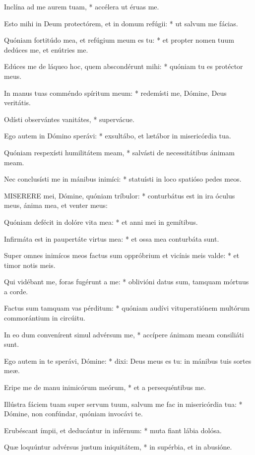 Inclína ad me aurem tuam, * accélera ut éruas me.

Esto mihi in Deum protectórem, et in domum refúgii: * ut salvum me fácias.

Quóniam fortitúdo mea, et refúgium meum es tu: * et propter nomen tuum dedúces me, et enútries me.

Edúces me de láqueo hoc, quem abscondérunt mihi: * quóniam tu es protéctor meus.

In manus tuas comméndo spíritum meum: * redemísti me, Dómine, Deus veritátis.

Odísti observántes vanitátes, * supervácue.

Ego autem in Dómino sperávi: * exsultábo, et lætábor in misericórdia tua.

Quóniam respexísti humilitátem meam, * salvásti de necessitátibus ánimam meam.

Nec conclusísti me in mánibus inimíci: * statuísti in loco spatióso pedes meos.


\lettrine[lines=2]{M}{ISERERE} mei, Dómine, quóniam tríbulor: * conturbátus est in ira óculus meus, ánima mea, et venter meus:

Quóniam defécit in dolóre vita mea: * et anni mei in gemítibus.

Infirmáta est in paupertáte virtus mea: * et ossa mea conturbáta sunt.

Super omnes inimícos meos factus sum oppróbrium et vicínis meis valde: * et timor notis meis.

Qui vidébant me, foras fugérunt a me: * oblivióni datus sum, tamquam mórtuus a corde.

Factus sum tamquam vas pérditum: * quóniam audívi vituperatiónem multórum commorántium in circúitu.

In eo dum convenírent simul advérsum me, * accípere ánimam meam consiliáti sunt.

Ego autem in te sperávi, Dómine: * dixi: Deus meus es tu: in mánibus tuis sortes meæ.

Eripe me de manu inimicórum meórum, * et a persequéntibus me.

Illústra fáciem tuam super servum tuum, salvum me fac in misericórdia tua: * Dómine, non confúndar, quóniam invocávi te.

Erubéscant ímpii, et deducántur in inférnum: * muta fiant lábia dolósa.

Quæ loquúntur advérsus justum iniquitátem, * in supérbia, et in abusióne.

